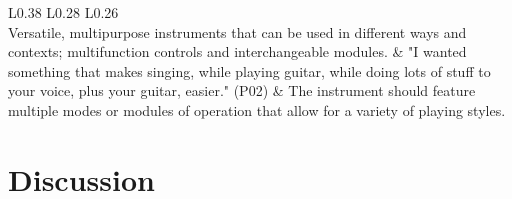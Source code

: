 \documentclass[letterpaper, 12pt]{article}
\begin{document}
\begin{table}[t]
\begin{tabular}{L{0.38\textwidth} L{0.28\textwidth} L{0.26\textwidth}}
         \\
        Versatile, multipurpose instruments that can be used in different ways and contexts; multifunction controls and interchangeable modules. &
        "I wanted something that makes singing, while playing guitar, while doing lots of stuff to your voice, plus your guitar, easier." (P02) &
        The instrument should feature multiple modes or modules of operation that allow for a variety of playing styles. \\
        \hline
        
    \end{tabular}
    \label{tab:themes-and-specs}
\end{table}


\section{Discussion}
\label{ch3-sec:discussion}
\end{document}
